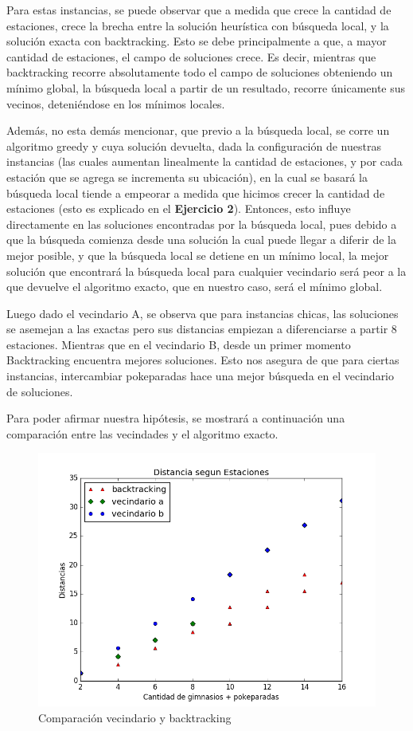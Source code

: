 \par Para estas instancias, se puede observar que a medida que crece la cantidad de estaciones, crece la brecha entre la solución heurística con búsqueda local, y la solución exacta con backtracking. Esto se debe principalmente a que, a mayor cantidad de estaciones, el campo de soluciones crece. Es decir, mientras que backtracking recorre absolutamente todo el campo de soluciones obteniendo un mínimo global, la búsqueda local a partir de un resultado, recorre únicamente sus vecinos, deteniéndose en los mínimos locales.

\par Además, no esta demás mencionar, que previo a la búsqueda local, se corre un algoritmo greedy y cuya solución devuelta, dada la configuración de nuestras instancias (las cuales aumentan linealmente la cantidad de estaciones, y por cada estación que se agrega se incrementa su ubicación), en la cual se basará la búsqueda local tiende a empeorar a medida que hicimos crecer la cantidad de estaciones (esto es explicado en el \textbf{Ejercicio 2}). Entonces, esto influye directamente en las soluciones encontradas por la búsqueda local, pues debido a que la búsqueda comienza desde una solución la cual puede llegar a diferir de la mejor posible, y que la búsqueda local se detiene en un mínimo local, la mejor solución que encontrará la búsqueda local para cualquier vecindario será peor a la que devuelve el algoritmo exacto, que en nuestro caso, será el mínimo global.

\par Luego dado el vecindario A, se observa que para instancias chicas, las soluciones se asemejan a las exactas pero sus distancias empiezan a diferenciarse a partir 8 estaciones. Mientras que en el vecindario B, desde un primer momento Backtracking encuentra mejores soluciones. Esto nos asegura de que para ciertas instancias, intercambiar pokeparadas hace una mejor búsqueda en el vecindario de soluciones. 

Para poder afirmar nuestra hipótesis, se mostrará a continuación una comparación entre las vecindades y el algoritmo exacto.

  \begin{figure}[H]
      \begin{center}
        \includegraphics[width=0.7\columnwidth]{imagenes/Ej3/Exp2Ej3TODO.png}
        \caption{Comparación vecindario y backtracking}
      \end{center}
  \end{figure}


